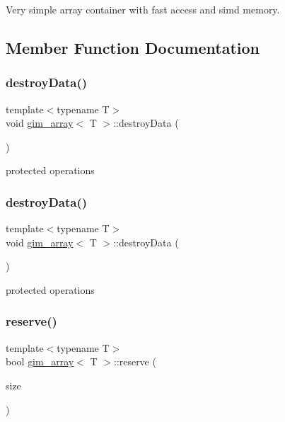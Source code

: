 Very simple array container with fast access and simd memory. 

\subsection{Member Function Documentation}
\mbox{\label{classgim__array_aa7a9dca42674415635846cd077cb4a97}} 
\subsubsection{\texorpdfstring{destroy\+Data()}{destroyData()}\hspace{0.1cm}{\footnotesize\ttfamily [1/2]}}
{\footnotesize\ttfamily template$<$typename T$>$ \\
void \hyperlink{classgim__array}{gim\+\_\+array}$<$ T $>$\+::destroy\+Data (\begin{DoxyParamCaption}{ }\end{DoxyParamCaption})\hspace{0.3cm}{\ttfamily [inline]}}

protected operations \mbox{\label{classgim__array_aa7a9dca42674415635846cd077cb4a97}} 
\subsubsection{\texorpdfstring{destroy\+Data()}{destroyData()}\hspace{0.1cm}{\footnotesize\ttfamily [2/2]}}
{\footnotesize\ttfamily template$<$typename T$>$ \\
void \hyperlink{classgim__array}{gim\+\_\+array}$<$ T $>$\+::destroy\+Data (\begin{DoxyParamCaption}{ }\end{DoxyParamCaption})\hspace{0.3cm}{\ttfamily [inline]}}

protected operations \mbox{\label{classgim__array_a572f94b5b67d505335150a2dea8a7e3d}} 
\subsubsection{\texorpdfstring{reserve()}{reserve()}\hspace{0.1cm}{\footnotesize\ttfamily [1/2]}}
{\footnotesize\ttfamily template$<$typename T$>$ \\
bool \hyperlink{classgim__array}{gim\+\_\+array}$<$ T $>$\+::reserve (\begin{DoxyParamCaption}\item[{G\+U\+I\+NT}]{size }\end{DoxyParamCaption})\hspace{0.3cm}{\ttfamily [inline]}}

